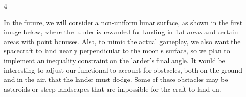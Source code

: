 \documentclass[a0]{4by3}
\newcommand{\NumColumns}{4}
\begin{document}
\begin{minipage}{\linewidth + 2\fboxsep}
\begin{multicols*}{\NumColumns}


In the future, we will consider a non-uniform lunar surface, as shown in the first image below, where the lander is rewarded for landing in flat areas and certain areas with point bonuses. Also, to mimic the actual gameplay, we also want the spacecraft to land nearly perpendicular to the moon's surface, so we plan to implement an inequality constraint on the lander's final angle. It would be interesting to adjust our functional to account for obstacles, both on the ground and in the air, that the lander must dodge. Some of these obstacles may be asteroids or steep landscapes that are impossible for the craft to land on.



{\small
\setlength{\itemsep}{-1ex}
\setlength{\parskip}{0pt}
\setlength{\parsep}{0pt}
}
\end{multicols*}
\end{minipage}


\vspace{1in}
\end{document}
